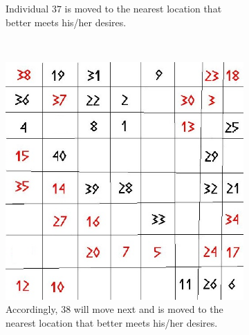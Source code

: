 \begin{figure}[H]
\begin{subfigure}{0.3\textwidth}
        \caption{Individual $37$ is moved to the nearest location that better meets his/her desires. }
        \label{fig:movement2}
    \end{subfigure}
    ~ %
    \begin{subfigure}{0.3\textwidth}
        \includegraphics[width=\textwidth]{Tegenvoorbeeld/segregation_tegenvb_2.jpg}
        \caption{Accordingly, $38$ will move next and is moved to the nearest location that better meets his/her desires.}
        \label{fig:movement3}
    \end{subfigure}\hspace{1cm}
    \begin{subfigure}{0.3\textwidth}

\end{subfigure}
\end{figure}
